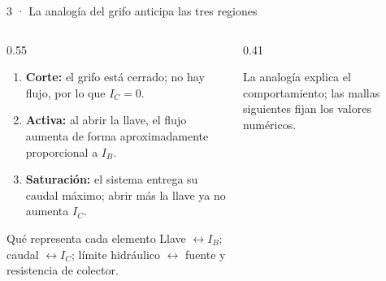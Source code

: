 \documentclass[aspectratio=169]{beamer}
\begin{document}
\begin{frame}{3 · La analogía del grifo anticipa las tres regiones}
  \begin{columns}[T]
    \begin{column}{0.55\textwidth}
      \begin{enumerate}
        \item \textbf{Corte:} el grifo está cerrado; no hay flujo, por lo que $I_C=0$.
        \item \textbf{Activa:} al abrir la llave, el flujo aumenta de forma aproximadamente proporcional a $I_B$.
        \item \textbf{Saturación:} el sistema entrega su caudal máximo; abrir más la llave ya no aumenta $I_C$.
      \end{enumerate}
      \begin{block}{Qué representa cada elemento}
        Llave $\leftrightarrow I_B$; caudal $\leftrightarrow I_C$; límite hidráulico
        $\leftrightarrow$ fuente y resistencia de colector.
      \end{block}
    \end{column}
    \begin{column}{0.41\textwidth}
      \centering
      \vspace{8pt}
      \par\small La analogía explica el comportamiento; las mallas siguientes fijan los valores numéricos.
    \end{column}
  \end{columns}
\end{frame}
\end{document}
